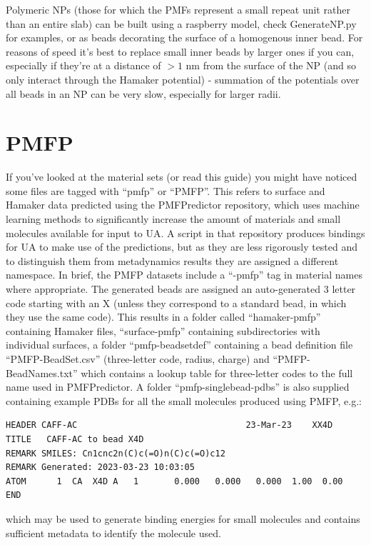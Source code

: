 \documentclass[10pt,a4paper,onecolumn]{report}
\begin{document}
Polymeric NPs (those for which the PMFs represent a small repeat unit rather than an entire slab) can be built using a raspberry model, check GenerateNP.py for examples, or as beads decorating the surface of a homogenous inner bead. For reasons of speed it's best to replace small inner beads by larger ones if you can, especially if they're at a distance of $> 1$ nm from the surface of the NP (and so only interact through the Hamaker potential) - summation of the potentials over all beads in an NP can be very slow, especially for larger radii. 


\section{PMFP} \label{section:pmfp}
If you've looked at the material sets (or read this guide) you might have noticed some files are tagged with ``pmfp'' or ``PMFP''. This refers to surface and Hamaker data predicted using the PMFPredictor repository, which uses machine learning methods to significantly increase the amount of materials and small molecules available for input to UA. A script in that repository produces bindings for UA to make use of the predictions, but as they are less rigorously tested and to distinguish them from metadynamics results they are assigned a different namespace. In brief, the PMFP datasets include a ``-pmfp'' tag in material names where appropriate. The generated beads are assigned an auto-generated 3 letter code starting with an X (unless they correspond to a standard bead, in which they use the same code). This results in a folder called ``hamaker-pmfp'' containing Hamaker files, ``surface-pmfp'' containing subdirectories with individual surfaces, a folder ``pmfp-beadsetdef'' containing a bead definition file ``PMFP-BeadSet.csv'' (three-letter code, radius, charge) and ``PMFP-BeadNames.txt'' which contains a lookup table for three-letter codes to the full name used in PMFPredictor. A folder ``pmfp-singlebead-pdbs'' is also supplied containing example PDBs for all the small molecules produced using PMFP, e.g.:
\begin{lstlisting}
HEADER CAFF-AC                                 23-Mar-23    XX4D
TITLE   CAFF-AC to bead X4D
REMARK SMILES: Cn1cnc2n(C)c(=O)n(C)c(=O)c12
REMARK Generated: 2023-03-23 10:03:05
ATOM      1  CA  X4D A   1       0.000   0.000   0.000  1.00  0.00
END
\end{lstlisting}
which may be used to generate binding energies for small molecules and contains sufficient metadata to identify the molecule used. 
\end{document}
